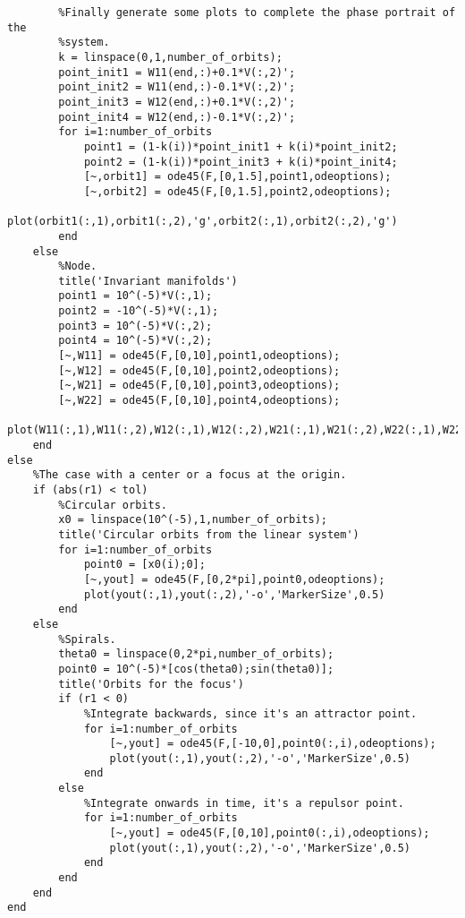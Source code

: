 \documentclass[twoside]{article}
\begin{document}
\begin{verbatim}
        %Finally generate some plots to complete the phase portrait of the
        %system.
        k = linspace(0,1,number_of_orbits);
        point_init1 = W11(end,:)+0.1*V(:,2)';
        point_init2 = W11(end,:)-0.1*V(:,2)';
        point_init3 = W12(end,:)+0.1*V(:,2)';
        point_init4 = W12(end,:)-0.1*V(:,2)';
        for i=1:number_of_orbits
            point1 = (1-k(i))*point_init1 + k(i)*point_init2;
            point2 = (1-k(i))*point_init3 + k(i)*point_init4;
            [~,orbit1] = ode45(F,[0,1.5],point1,odeoptions);
            [~,orbit2] = ode45(F,[0,1.5],point2,odeoptions);
            plot(orbit1(:,1),orbit1(:,2),'g',orbit2(:,1),orbit2(:,2),'g')
        end
    else
        %Node.
        title('Invariant manifolds')
        point1 = 10^(-5)*V(:,1);
        point2 = -10^(-5)*V(:,1);
        point3 = 10^(-5)*V(:,2);
        point4 = 10^(-5)*V(:,2);
        [~,W11] = ode45(F,[0,10],point1,odeoptions);
        [~,W12] = ode45(F,[0,10],point2,odeoptions);
        [~,W21] = ode45(F,[0,10],point3,odeoptions);
        [~,W22] = ode45(F,[0,10],point4,odeoptions);
        plot(W11(:,1),W11(:,2),W12(:,1),W12(:,2),W21(:,1),W21(:,2),W22(:,1),W22(:,2),'r');
    end
else
    %The case with a center or a focus at the origin.
    if (abs(r1) < tol)
        %Circular orbits.
        x0 = linspace(10^(-5),1,number_of_orbits);
        title('Circular orbits from the linear system')
        for i=1:number_of_orbits
            point0 = [x0(i);0];
            [~,yout] = ode45(F,[0,2*pi],point0,odeoptions);
            plot(yout(:,1),yout(:,2),'-o','MarkerSize',0.5)
        end
    else
        %Spirals.
        theta0 = linspace(0,2*pi,number_of_orbits);
        point0 = 10^(-5)*[cos(theta0);sin(theta0)];
        title('Orbits for the focus')
        if (r1 < 0)
            %Integrate backwards, since it's an attractor point.
            for i=1:number_of_orbits
                [~,yout] = ode45(F,[-10,0],point0(:,i),odeoptions);
                plot(yout(:,1),yout(:,2),'-o','MarkerSize',0.5)
            end
        else
            %Integrate onwards in time, it's a repulsor point.
            for i=1:number_of_orbits
                [~,yout] = ode45(F,[0,10],point0(:,i),odeoptions);
                plot(yout(:,1),yout(:,2),'-o','MarkerSize',0.5)
            end
        end
    end
end
\end{verbatim}
\end{document}
